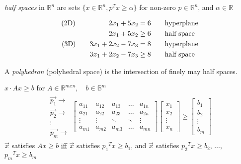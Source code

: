 \begin{definition-N}
	\emph{half spaces} in $\mathbb{R}^n$ are sets $\{x \in \mathbb{R}^n, p^Tx \geq \alpha \}$ for non-zero $p \in \mathbb{R}^n$, and $\alpha \in \mathbb{R}$
\end{definition-N}
\begin{example-N}
	\begin{align*}
		\text{(2D)} \hspace{4.8em} 2x_1 + 5x_2 = 6 \qquad & \text{hyperplane}\\
		2x_1 + 5x_2 \geq 6 \qquad & \text{half space}\\
		\text{(3D)} \qquad 3x_1 + 2x_2 - 7x_3 = 8 \qquad & \text{hyperplane}\\
		3x_1 + 2x_2 - 7x_3 \geq 8 \qquad & \text{half space}
	\end{align*}
\end{example-N}
\begin{definition-N}
	A \emph{polyhedron} (polyhedral space) is the intersection of finely may half spaces.
	\begin{example-N}
		$x \cdot Ax \geq b$ for $A \in \mathbb{R}^{mxn}, \quad b \in \mathbb{B}^m$
		\begin{gather*}
			\begin{matrix}
				\vec{p_1} \rightarrow\\
				\vec{p_2} \rightarrow\\
				\vdots\\
				\vec{p_m} \rightarrow
			\end{matrix}
			\begin{bmatrix}
				a_{11} & a_{12} & a_{13} & \ldots & a_{1n}\\
				a_{21} & a_{22} & a_{23} & \ldots & a_{2n}\\
				\vdots & \vdots & \ddots & \ddots & \vdots\\
				a_{m1} & a_{m2} & a_{m3} & \ldots & a_{mn}
			\end{bmatrix}
			\begin{bmatrix}
				x_1 \\ x_2\\ \vdots\\ x_n
			\end{bmatrix} \geq
			\begin{bmatrix}
				b_1\\ b_2\\ \vdots\\ b_m
			\end{bmatrix}
		\end{gather*}
		$\vec{x}$ satisfies $Ax \geq b$ \underline{iff} $\vec{x}$ satisfies ${p_1}^Tx \geq b_1$, and $\vec{x}$ satisfies ${p_2}^Tx \geq b_2$, $\ldots$, ${p_m}^Tx \geq b_m$
	\end{example-N}
\end{definition-N}
